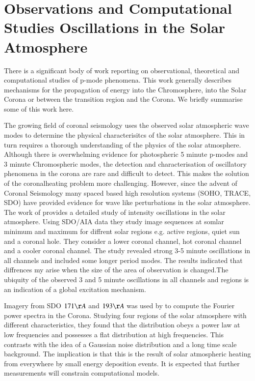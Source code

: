 \documentclass[final,1p]{elsarticle}
\begin{document}
\section{Observations and Computational Studies Oscillations in the Solar Atmosphere}

There is a significant body of work reporting on observational, theoretical and computational studies of p-mode phenomena. This work generally describes mechanisms for the propagation of energy into the Chromosphere, into the Solar Corona or between the transition region and the Corona. We briefly summarise some of this work here. 

The growing field of coronal seismology uses the observed solar atmospheric wave modes to determine the physical characterisitcs of the solar atmosphere. This in turn requires a thorough understanding of the physics of the solar atmosphere. Although there is overwhelming evidence for photospheric 5 minute p-modes and 3 minute Chromospheric modes, the detection and characterisation of oscillatory phenomena in the corona are rare and difficult to detect. This makes the solution of the coronalheating problem more challenging. However, since the advent of Coronal Seismology \cite{Roberts1984} \cite{DeMoortel2005} many spaced based high resolution systems (SOHO, TRACE, SDO) have provided evidence for wave like perturbations in the solar atmosphere.
The work of \cite{Erdelyi2015} provides a detailed study of intensity oscillations in the solar atmosphere. Using SDO/AIA data they study image sequences at somlar minimum and maximum for diffrent solar regions e.g. active regions, quiet sun and a coronal hole. They consider a lower coronal channel, hot coronal channel and a cooler coronal channel. The study revealed strong 3-5 minute oscillations in all channels and included some longer period modes. The results indicated that diffrences my arise when the size of the area of observation is changed.The ubiquity of the observed 3 and 5 minute oscillations in all channels and regions is an indication of a global excitation mechanism.

 Imagery from SDO $171\AA$ and $193\AA$ was used by \cite{Ireland2014} to compute the Fourier power spectra in the Corona. Studying four regions of the solar atmosphere with different characteristics, they found that the distribution obeys a power law at low frequencies and possesses a flat distribution at high frequencies. This contrasts with the idea of a Gaussian noise distribution and a long time scale background. The implication is that this is the result of solar atmospheric heating from everywhere by small energy deposition events. It is expected that further measurements will constrain computational models. 
\end{document}
